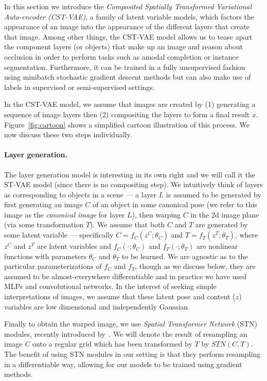 In this section we introduce the \emph{Composited Spatially Transformed Variational Auto-encoder  (CST-VAE)},
a family of latent variable models, which factors
the appearance of an image into the appearance of the different layers
that create that image.  
Among other things, the CST-VAE model allows us to tease
apart the component layers (or objects) that make up an image and reason about occlusion in order to perform tasks such as amodal completion or instance segmentation.
Furthermore, it can be trained in a fully unsupervised fashion using  minibatch stochastic
gradient descent methods but can also make use of labels in supervised or semi-supervised settings.
 
 In the CST-VAE model, we assume that images are created by (1) generating a sequence of image layers 
 then (2) compositing the layers to form a final result $x$.  Figure~\ref{fig:cartoon} shows a simplified cartoon illustration of this process.  
 We now discuss these two steps individually.
 \paragraph{Layer generation.}
 The layer generation model is interesting in its own right and we will call it the ST-VAE model (since there is no compositing step).
 We intuitively think of  layers as corresponding to objects in a scene --- a layer $L$ is assumed 
 to be generated by first generating an image $C$ of an object in some canonical pose (we refer to this image as
 the \emph{canonical image} for layer $L$), then warping $C$ in the 2d image plane (via some transformation $T$).
We assume that both $C$ and $T$ are generated by some latent variable --- specifically $C = f_C(z^C; \theta_C)$ and $T = f_T(z^T; \theta_T)$,
where $z^C$ and $z^T$ are latent variables and $f_C(\cdot; \theta_C)$ and $f_T(\cdot; \theta_T)$ are nonlinear functions with parameters
$\theta_C$ and $\theta_T$ to be learned. 
We are agnostic as to the particular parameterizations of $f_C$ and $f_T$, though as we discuss below, they
are assumed to be almost-everywhere differentiable and in practice we have used MLPs and convolutional networks.
In the interest of seeking simple interpretations of images, we assume that these latent pose and content ($z$) variables are low 
dimensional and independently Gaussian.

Finally to obtain the warped image, we
use \emph{Spatial Transformer Network} (STN) modules, recently introduced by~\cite{jaderberg2015spatial}.
We will denote  the result of resampling an image $C$ onto a regular grid which has been transformed by $T$ by $STN(C, T)$.
The benefit of using STN modules in our setting 
is that they perform resampling in a differentiable way, allowing for our models to be trained using gradient methods.



